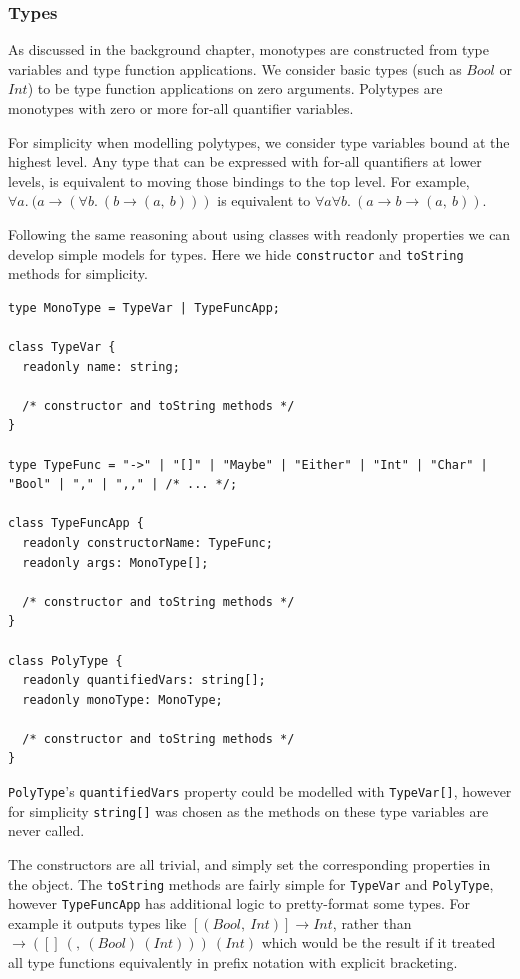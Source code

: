 \documentclass[a4paper,fleqn,oneside,12pt]{report}
\begin{document}
\subsubsection{Types}\label{id:h.bzdo56ibho4h}

As discussed in the background chapter, monotypes are constructed from type variables and type function applications. We consider basic types (such as $Bool$ or $Int$) to be type function applications on zero arguments. Polytypes are monotypes with zero or more for-all quantifier variables.

For simplicity when modelling polytypes, we consider type variables bound at the highest level. Any type that can be expressed with for-all quantifiers at lower levels, is equivalent to moving those bindings to the top level. For example, $\forall a.\ (a \rightarrow (\forall b.\ (b \rightarrow (a,\ b)))$ is equivalent to $\forall a \forall b.\ (a \rightarrow b \rightarrow (a,\ b))$.

Following the same reasoning about using classes with readonly properties we can develop simple models for types. Here we hide \texttt{constructor} and \texttt{toString} methods for simplicity.

\begin{verbatim}
type MonoType = TypeVar | TypeFuncApp;

class TypeVar {
  readonly name: string;

  /* constructor and toString methods */
}

type TypeFunc = "->" | "[]" | "Maybe" | "Either" | "Int" | "Char" | "Bool" | "," | ",," | /* ... */;

class TypeFuncApp {
  readonly constructorName: TypeFunc;
  readonly args: MonoType[];

  /* constructor and toString methods */
}

class PolyType {
  readonly quantifiedVars: string[];
  readonly monoType: MonoType;

  /* constructor and toString methods */
}
\end{verbatim}
\texttt{PolyType}'s \texttt{quantifiedVars} property could be modelled with \texttt{TypeVar[]}, however for simplicity \texttt{string[]} was chosen as the methods on these type variables are never called.

The constructors are all trivial, and simply set the corresponding properties in the object. The \texttt{toString} methods are fairly simple for \texttt{TypeVar} and \texttt{PolyType}, however \texttt{TypeFuncApp} has additional logic to pretty-format some types. For example it outputs types like $[(Bool,\ Int)] \rightarrow Int$, rather than $\rightarrow ([]\ (,\ (Bool)\ (Int)))\ (Int)$ which would be the result if it treated all type functions equivalently in prefix notation with explicit bracketing.
\end{document}
